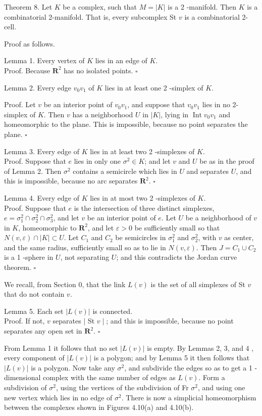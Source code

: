 Theorem 8. Let $K$ be a complex, such that $M=|K|$ is a 2 -manifold. Then $K$ is a combinatorial 2-manifold. That is, every subcomplex St $v$ is a combinatorial 2-cell.

Proof as follows.

Lemma 1. Every vertex of $K$ lies in an edge of $K$.\\
Proof. Because $\mathbf{R}^{2}$ has no isolated points. \(\square\)

Lemma 2. Every edge $v_{0} v_{1}$ of $K$ lies in at least one 2 -simplex of $K$.

Proof. Let $v$ be an interior point of $v_{0} v_{1}$, and suppose that $v_{0} v_{1}$ lies in no 2-simplex of $K$. Then $v$ has a neighborhood $U$ in $|K|$, lying in $\operatorname{Int} v_{0} v_{1}$ and homeomorphic to the plane. This is impossible, because no point separates the plane. \(\square\)

Lemma 3. Every edge of $K$ lies in at least two 2 -simplexes of $K$.\\
Proof. Suppose that $e$ lies in only one $\sigma^{2} \in K$; and let $v$ and $U$ be as in the proof of Lemma 2. Then $\sigma^{2}$ contains a semicircle which lies in $U$ and separates $U$, and this is impossible, because no arc separates $\mathbf{R}^{2}$. \(\square\)

Lemma 4. Every edge of $K$ lies in at most two 2 -simplexes of $K$.\\
Proof. Suppose that $e$ is the intersection of three distinct simplexes, $e=\sigma_{1}^{2} \cap \sigma_{2}^{2} \cap \sigma_{3}^{2}$, and let $v$ be an interior point of $e$. Let $U$ be a neighborhood of $v$ in $K$, homeomorphic to $\mathbf{R}^{2}$, and let $\varepsilon>0$ be sufficiently small so that $N(v, \varepsilon) \cap|K| \subset U$. Let $C_{1}$ and $C_{2}$ be semicircles in $\sigma_{1}^{2}$ and $\sigma_{2}^{2}$, with $v$ as center, and the same radius, sufficiently small so as to lie in $N(v, \varepsilon)$. Then $J=C_{1} \cup C_{2}$ is a 1 -sphere in $U$, not separating $U$; and this contradicts the Jordan curve theorem. \(\square\)

We recall, from Section 0, that the link $L(v)$ is the set of all simplexes of St $v$ that do not contain $v$.

Lemma 5. Each set $|L(v)|$ is connected.\\
Proof. If not, $v$ separates $\mid$ St $v \mid$; and this is impossible, because no point separates any open set in $\mathbf{R}^{2}$. \(\square\)

From Lemma 1 it follows that no set $|L(v)|$ is empty. By Lemmas 2, 3, and 4 , every component of $|L(v)|$ is a polygon; and by Lemma 5 it then follows that $|L(v)|$ is a polygon. Now take any $\sigma^{2}$, and subdivide the edges so as to get a 1 -dimensional complex with the same number of edges as $L(v)$. Form a subdivision of $\sigma^{2}$, using the vertices of the subdivision of Fr $\sigma^{2}$, and using one new vertex which lies in no edge of $\sigma^{2}$. There is now a simplicial homeomorphism between the complexes shown in Figures 4.10(a) and 4.10(b).

\begin{center}
\end{center}



